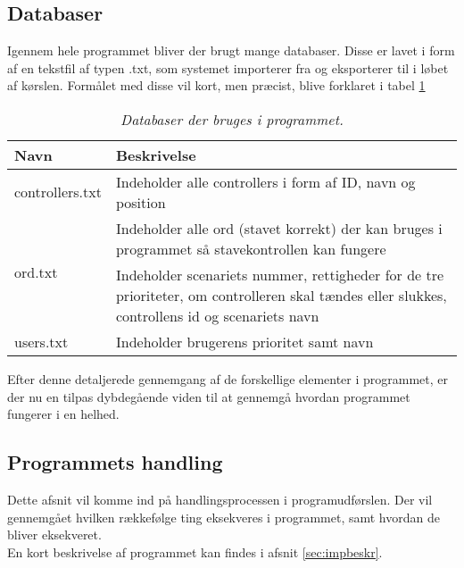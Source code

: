 \subsection{Databaser} %
Igennem hele programmet bliver der brugt mange databaser. Disse er lavet i form af en tekstfil af typen .txt, som systemet importerer fra og eksporterer til i løbet af kørslen. Formålet med disse vil kort, men præcist, blive forklaret i tabel \ref{tab:databases}

\begin{table}[h]
    \centering
    \begin{threeparttable}
        \begin{tabular}{ p{3cm}|p{11cm} }
            Navn & Beskrivelse \\ \hline \hline
            \multirow{1}{*}{controllers.txt} & Indeholder alle controllers i form af ID, navn og position \\ \hline
            \multirow{2}{*}{ord.txt} & Indeholder alle ord (stavet korrekt) der kan bruges i programmet så stavekontrollen kan fungere \\ \hline 
            \multirow{2}{*}{scenarier.txt} & Indeholder scenariets nummer, rettigheder for de tre prioriteter, om controlleren skal tændes eller slukkes, controllens id og scenariets navn \\ \hline
            \multirow{1}{*}{users.txt} & Indeholder brugerens prioritet samt navn \\ \hline
        \end{tabular}
    \end{threeparttable}
    \caption{\textit{Databaser der bruges i programmet. \tabelgroup}}
    \label{tab:databases}
\end{table} 

Efter denne detaljerede gennemgang af de forskellige elementer i programmet, er der nu en tilpas dybdegående viden til at gennemgå hvordan programmet fungerer i en helhed.

\subsection{Programmets handling}\label{sec:implemprogramaction}

Dette afsnit vil komme ind på handlingsprocessen i programudførslen. Der vil gennemgået hvilken rækkefølge ting eksekveres i programmet, samt hvordan de bliver eksekveret.\\
En kort beskrivelse af programmet kan findes i afsnit \ref{sec:impbeskr}.\\

